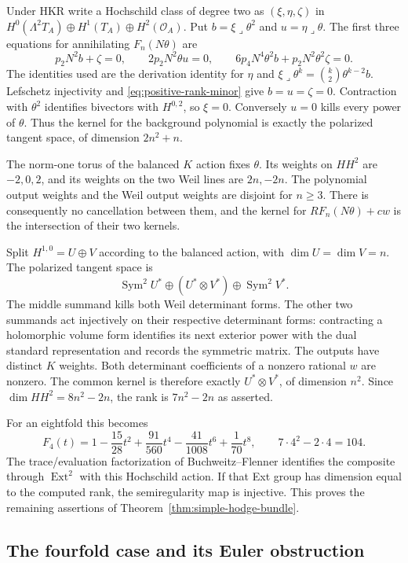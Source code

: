 \documentclass[11pt]{article}
\theoremstyle{definition}
\theoremstyle{remark}
\begin{document}
Under HKR write a Hochschild class of degree two as
$(\xi,\eta,\zeta)$ in
$H^0(\Lambda^2T_A)\oplus H^1(T_A)\oplus H^2(\mathcal O_A)$.
Put $b=\xi\lrcorner\theta^2$ and $u=\eta\lrcorner\theta$.
The first three equations for annihilating $F_n(N\theta)$ are
\[
 p_2N^2b+\zeta=0,\qquad 2p_2N^2\theta u=0,
 \qquad 6p_4N^4\theta^2b+p_2N^2\theta^2\zeta=0.
\]
The identities used are the derivation identity for $\eta$ and
$\xi\lrcorner\theta^k=\binom k2\theta^{k-2}b$.
Lefschetz injectivity and \eqref{eq:positive-rank-minor} give
$b=u=\zeta=0$.  Contraction with $\theta^2$ identifies bivectors
with $H^{0,2}$, so $\xi=0$.  Conversely $u=0$ kills every power
of $\theta$.  Thus the kernel for the background polynomial is
exactly the polarized tangent space, of dimension $2n^2+n$.

The norm-one torus of the balanced $K$ action fixes $\theta$.
Its weights on $HH^2$ are $-2,0,2$, and its weights on the two Weil
lines are $2n,-2n$.  The polynomial output weights and the Weil
output weights are disjoint for $n\ge3$.  There is consequently
no cancellation between them, and the kernel for
$R F_n(N\theta)+cw$ is the intersection of their two kernels.

Split $H^{1,0}=U\oplus V$ according to the balanced action, with
$\dim U=\dim V=n$.  The polarized tangent space is
\[
 \operatorname{Sym}^2U^*\oplus(U^*\otimes V^*)
                         \oplus\operatorname{Sym}^2V^*.
\]
The middle summand kills both Weil determinant forms.  The other
two summands act injectively on their respective determinant forms:
contracting a holomorphic volume form identifies its next exterior
power with the dual standard representation and records the
symmetric matrix.  The outputs have distinct $K$ weights.
Both determinant coefficients of a nonzero rational $w$ are nonzero.
The common kernel is therefore exactly $U^*\otimes V^*$,
of dimension $n^2$.  Since $\dim HH^2=8n^2-2n$, the rank is
$7n^2-2n$ as asserted.

For an eightfold this becomes
\[
 F_4(t)=1-\frac{15}{28}t^2+\frac{91}{560}t^4
               -\frac{41}{1008}t^6+\frac1{70}t^8,
 \qquad 7\cdot4^2-2\cdot4=104.
\]
The trace/evaluation factorization of Buchweitz--Flenner
\cite[Proposition~6.2.1 and Theorem~6.4.2]{BFHH} identifies the
composite through $\operatorname{Ext}^2$ with this Hochschild action.
If that Ext group has dimension equal to the computed rank,
the semiregularity map is injective.  This proves the remaining
assertions of Theorem~\ref{thm:simple-hodge-bundle}.

\subsection{The fourfold case and its Euler obstruction}
\end{document}

